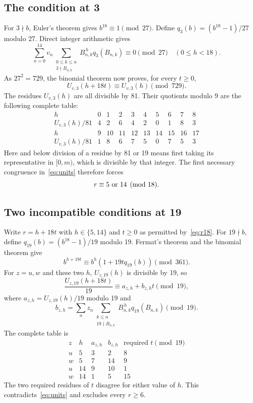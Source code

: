 \documentclass[11pt]{article}
\begin{document}
\subsection*{The condition at 3}
For $3\nmid b$, Euler's theorem gives $b^{18}\equiv1\pmod{27}$.
Define $q_3(b)=(b^{18}-1)/27$ modulo 27. Direct integer arithmetic gives
\begin{equation}\label{eq:derivative}
 \sum_{n=0}^{14}v_n
 \sum_{\substack{0\le k\le n\\3\nmid B_{n,k}}}
 B_{n,k}^{\,h}q_3(B_{n,k})\equiv0\pmod{27}
 \quad(0\le h<18).
\end{equation}
As $27^2=729$, the binomial theorem now proves, for every $t\ge0$,
\[
 U_{v,3}(h+18t)\equiv U_{v,3}(h)\pmod{729}.
\]
The residues $U_{v,3}(h)$ are all divisible by 81. Their quotients modulo 9
are the following complete table:
\[
\begin{array}{c|rrrrrrrrr}
h&0&1&2&3&4&5&6&7&8\\\hline
U_{v,3}(h)/81&4&2&6&4&2&0&1&8&3\\[2pt]
h&9&10&11&12&13&14&15&16&17\\\hline
U_{v,3}(h)/81&1&8&6&7&5&0&7&5&3
\end{array}
\]
Here and below division of a residue by 81 or 19 means first taking its
representative in $[0,m)$, which is divisible by that integer.
The first necessary congruence in~\eqref{eq:units} therefore forces
\begin{equation}\label{eq:r18}
 r\equiv5\ \hbox{or}\ 14\pmod{18}.
\end{equation}

\subsection*{Two incompatible conditions at 19}
Write $r=h+18t$ with $h\in\{5,14\}$ and $t\ge0$ as permitted
by~\eqref{eq:r18}. For $19\nmid b$, define
$q_{19}(b)=(b^{18}-1)/19$ modulo 19. Fermat's theorem and the binomial
theorem give
\[
 b^{h+18t}\equiv b^h(1+19tq_{19}(b))\pmod{361}.
\]
For $z=u,w$ and these two $h$, $U_{z,19}(h)$ is divisible by 19, so
\[
 \frac{U_{z,19}(h+18t)}{19}\equiv a_{z,h}+b_{z,h}t\pmod{19},
\]
where $a_{z,h}=U_{z,19}(h)/19$ modulo 19 and
\[
 b_{z,h}=\sum_n z_n\sum_{\substack{k\le n\\19\nmid B_{n,k}}}
 B_{n,k}^{\,h}q_{19}(B_{n,k})\pmod{19}.
\]
The complete table is
\[
\begin{array}{cc|rr|r}
z&h&a_{z,h}&b_{z,h}&\text{required }t\pmod{19}\\\hline
u&5 &3&2&8\\
w&5 &7&14&9\\
u&14&9&10&1\\
w&14&1&5&15
\end{array}
\]
The two required residues of $t$ disagree for either value of $h$.
This contradicts~\eqref{eq:units} and excludes every $r\ge6$.
\end{document}
